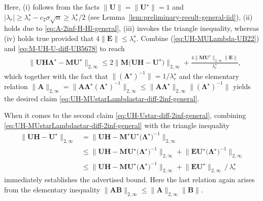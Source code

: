 %
Here, (i) follows from the facts $\|\bm{U}\|=\|\bm{U}^{\star}\|=1$ and $|\lambda_r| \geq \lambda_r^{\star} - c_2\sigma\sqrt{n} \geq  \lambda_r^{\star}/2$ (see Lemma~\ref{lem:preliminary-result-general-iid}),
 (ii) holds due to \eqref{eq:A-2inf-H-Hl-general},
(iii) invokes the triangle inequality,
whereas (iv) holds true provided that $4\|\bm{E}\|\leq \lambda^{\star}_r$.
Combine (\ref{eq:UH-MULambda-UB22}) and \eqref{eq:M-UH-U-diff-UB5678} to reach
\begin{align*}
 & \big\|\bm{U}\bm{H}\bm{\Lambda}^{\star}-\bm{M}\bm{U}^{\star}\big\|_{2,\infty}
  \leq 2\big\|\bm{M}\big(\bm{U}\bm{H}-\bm{U}^{\star}\big)\big\|_{2,\infty}
	+ \frac{4\big\|\bm{M}\bm{U}^{\star}\big\|_{2,\infty}\big\|\bm{E}\big\|}{\lambda_{r}^{\star}},
\end{align*}
which together with the fact that $\|(\bm{\Lambda}^\star)^{-1}\|=1/\lambda^{\star}_{r}$ and the elementary relation $\|\bm{A}\|_{2,\infty}=\|\bm{A}\bm{\Lambda}^\star(\bm{\Lambda}^\star)^{-1}\|_{2,\infty} \leq \|\bm{A}\bm{\Lambda}^\star\|_{2,\infty}\|(\bm{\Lambda}^\star)^{-1}\|$ yields the desired claim \eqref{eq:UH-MUstarLambdastar-diff-2inf-general}.





When it comes to the second claim \eqref{eq:UH-Ustar-diff-2inf-general}, combining \eqref{eq:UH-MUstarLambdastar-diff-2inf-general} with the triangle inequality
%
\begin{align*}
\big\|\bm{U}\bm{H}-\bm{U}^{\star}\big\|_{2,\infty} & = \big\|\bm{U}\bm{H}-\bm{M}^{\star}\bm{U}^{\star}\big(\bm{\Lambda}^{\star}\big)^{-1}\big\|_{2,\infty}\\
 & \leq\big\|\bm{U}\bm{H}-\bm{M}\bm{U}^{\star}\big(\bm{\Lambda}^{\star}\big)^{-1}\big\|_{2,\infty}+\big\|\bm{E}\bm{U}^{\star}\big(\bm{\Lambda}^{\star}\big)^{-1}\big\|_{2,\infty} \\
 & \leq\big\|\bm{U}\bm{H}-\bm{M}\bm{U}^{\star}\big(\bm{\Lambda}^{\star}\big)^{-1}\big\|_{2,\infty}
	+\big\|\bm{E}\bm{U}^{\star}\big\|_{2,\infty} \,/\, \lambda_r^{\star}
\end{align*}
%
immediately establishes the advertised bound. Here the last relation again arises from the elementary inequality $\|\bm{A}\bm{B}\|_{2,\infty}\leq \|\bm{A}\|_{2,\infty}\|\bm{B}\|$.






